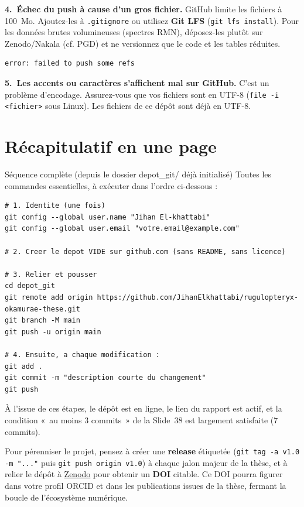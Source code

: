 \documentclass[11pt,a4paper]{article}
\begin{document}
\textbf{4.~Échec du push à cause d'un gros fichier.} GitHub limite les fichiers à
100~Mo. Ajoutez-les à \texttt{.gitignore} ou utilisez \textbf{Git LFS}
(\texttt{git lfs install}). Pour les données brutes volumineuses (spectres RMN),
déposez-les plutôt sur Zenodo/Nakala (cf. PGD) et ne versionnez que le code et les
tables réduites.
\begin{lstlisting}
error: failed to push some refs
\end{lstlisting}

\textbf{5.~Les accents ou caractères s'affichent mal sur GitHub.} C'est un problème
d'encodage. Assurez-vous que vos fichiers sont en UTF-8
(\texttt{file -i <fichier>} sous Linux). Les fichiers de ce dépôt sont déjà en UTF-8.

\section{Récapitulatif en une page}
\begin{etape}{Séquence complète (depuis le dossier depot\_git/ déjà initialisé)}
Toutes les commandes essentielles, à exécuter dans l'ordre ci-dessous :
\end{etape}
\begin{lstlisting}
# 1. Identite (une fois)
git config --global user.name "Jihan El-khattabi"
git config --global user.email "votre.email@example.com"

# 2. Creer le depot VIDE sur github.com (sans README, sans licence)

# 3. Relier et pousser
cd depot_git
git remote add origin https://github.com/JihanElkhattabi/rugulopteryx-okamurae-these.git
git branch -M main
git push -u origin main

# 4. Ensuite, a chaque modification :
git add .
git commit -m "description courte du changement"
git push
\end{lstlisting}

À l'issue de ces étapes, le dépôt est en ligne, le lien du rapport est actif, et la
condition «~au moins 3 commits~» de la Slide~38 est largement satisfaite (7 commits).

Pour pérenniser le projet, pensez à créer une \textbf{release} étiquetée
(\texttt{git tag -a v1.0 -m "..."} puis \texttt{git push origin v1.0}) à chaque jalon
majeur de la thèse, et à relier le dépôt à \href{https://zenodo.org}{Zenodo} pour
obtenir un \textbf{DOI} citable. Ce DOI pourra figurer dans votre profil ORCID et dans
les publications issues de la thèse, fermant la boucle de l'écosystème numérique.

\label{LastPage}
\end{document}
